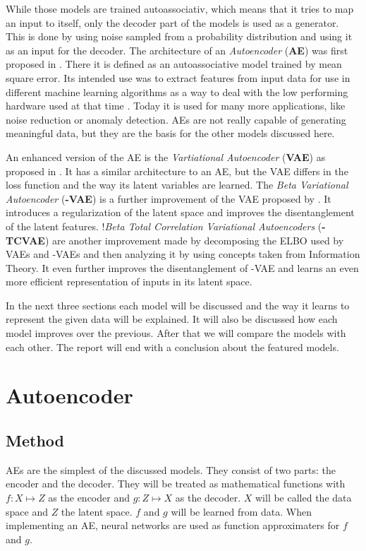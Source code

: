 \documentclass[a4paper]{IEEEtran}
\begin{document}
While those models are trained autoassociativ, which means that it tries to map an input to itself, only the decoder part of the models is used as a generator. This is done by using noise sampled from a probability distribution and using it as an input for the decoder. The architecture of an \textit{Autoencoder} (\textbf{AE}) was first proposed in \cite{ballard1987modulalearning}. There it is defined as an autoassociative model trained by mean square error. Its intended use was to extract features from input data for use in different machine learning algorithms as a way to deal with the low performing hardware used at that time \cite{ballard1987modulalearning}. Today it is used for many more applications, like noise reduction or anomaly detection. AEs are not really capable of generating meaningful data, but they are the basis for the other models discussed here.

An enhanced version of the AE is the \textit{Vartiational Autoencoder} (\textbf{VAE}) as proposed in \cite{kingma2014autoencoding}. It has a similar architecture to an AE, but the VAE differs in the loss function and the way its latent variables are learned. The \textit{Beta Variational Autoencoder} (\textbf{\textbeta -VAE}) is a further improvement of the VAE proposed by \cite{higgins2017vae}. It introduces a regularization of the latent space and improves the disentanglement of the latent features. !\textit{Beta Total Correlation Variational Autoencoders} (\textbf{\textbeta -TCVAE}) \cite{chen2019isolating} are another improvement made by decomposing the ELBO used by VAEs and \textbeta -VAEs and then analyzing it by using concepts taken from Information Theory. It even further improves the disentanglement of \textbeta -VAE and learns an even more efficient representation of inputs in its latent space.

In the next three sections each model will be discussed and the way it learns to represent the given data will be explained. It will also be discussed how each model improves over the previous. After that we will compare the models with each other. The report will end with a conclusion about the featured models.

\section{Autoencoder}
\subsection{Method}
AEs are the simplest of the discussed models. They consist of two parts: the encoder and the decoder. They will be treated as mathematical functions with $f : X \mapsto Z$ as the encoder and $g : Z \mapsto X$ as the decoder. $X$ will be called the data space and $Z$ the latent space. $f$ and $g$ will be learned from data. When implementing an AE, neural networks are used as function approximaters for $f$ and $g$.
\end{document}
